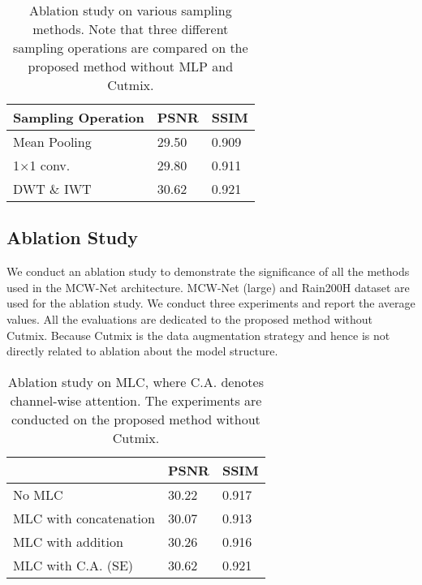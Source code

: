 \documentclass[a4paper,fleqn]{cas-dc}
\begin{document}
\begin{table}
	\caption{Ablation study on various sampling methods. Note that three different sampling operations are compared on the proposed method without MLP and Cutmix.}
	
	\begin{tabular*}{\tblwidth}{@{}LLL@{}}
		\toprule  
		Sampling Operation               & PSNR  & SSIM  \\ 
		\midrule
		Mean Pooling                     & 29.50 & 0.909 \\ 
		1$\times$1 conv.                 & 29.80 & 0.911 \\
	    DWT $\&$ IWT                     & 30.62 & 0.921 \\ 
	    \bottomrule
	\end{tabular*} 
	\label{tab:sampling-ablation}
\end{table}


\subsection{Ablation Study}


We conduct an ablation study to demonstrate the significance of all the methods used in the MCW-Net architecture. MCW-Net (large) and Rain200H dataset are used for the ablation study. We conduct three experiments and report the average values. All the evaluations are dedicated to the proposed method without Cutmix. Because Cutmix is the data augmentation strategy and hence is not directly related to ablation about the model structure.

\begin{table}
	\caption{Ablation study on MLC, where C.A. denotes channel-wise attention. The experiments are conducted on the proposed method without Cutmix.}
	
	\begin{tabular*}{\tblwidth}{@{}LLL@{}}
		\toprule  
		                               & PSNR  & SSIM  \\ 
		\midrule
		No MLC                          & 30.22 & 0.917\\
		MLC with concatenation       & 30.07 & 0.913 \\
		MLC with addition            & 30.26 & 0.916 \\
		MLC with C.A. (SE)           & 30.62 & 0.921 \\
	    \bottomrule
	\end{tabular*}
	\label{tab:mlc-ablation}
\end{table}
\end{document}
